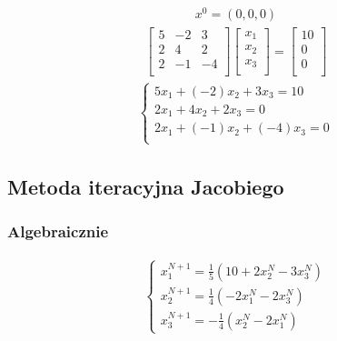 \documentclass[12pt]{article}
\begin{document}
    \begin{align*}
        x^0 = (0,0,0)
    \end{align*}
    \begin{align*}
        \begin{bmatrix}
            5 & -2 & 3\\
            2 & 4 & 2\\
            2 & -1 & -4\\
        \end{bmatrix}
        \begin{bmatrix}
            x_1\\
            x_2\\
            x_3\\
        \end{bmatrix}
        =
        \begin{bmatrix}
            10\\
            0\\
            0\\
        \end{bmatrix}
    \end{align*}
    \begin{align*}
        \left\{\begin{matrix}
                   5x_1 + (-2)x_2 + 3x_3 = 10\\
                   2x_1 + 4x_2 + 2x_3 = 0\\
                   2x_1 + (-1)x_2 + (-4)x_3 = 0\\
        \end{matrix}\right.
    \end{align*}

    \subsection{Metoda iteracyjna Jacobiego}

    \subsubsection{Algebraicznie}
    \begin{align*}
        \left\{\begin{matrix}
                   x^{N+1}_1 = \frac{1}{5}(10 + 2x^N_2 - 3x^N_3)\\
                   x^{N+1}_2 = \frac{1}{4}(-2x^N_1 - 2x^N_3)\\
                   x^{N+1}_3 = -\frac{1}{4}(x^N_2 - 2x^N_1)
        \end{matrix}\right.
    \end{align*}
\end{document}
